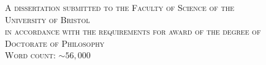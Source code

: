 
\newpage
\thispagestyle{empty}
\vspace*{\fill}%
\noindent
\textsc{
    \normalsize A dissertation submitted to the Faculty of Science of the \\ 
    \vspace{0.15cm}
    \LARGE University of Bristol \\    
    \vspace{0.3cm}
    \normalsize in accordance with the requirements for award of the degree of \\
    \vspace{0.15cm}
    \LARGE Doctorate of Philosophy \\

    \vspace{4cm}
    \small{Word count: $\sim56,000$}
}

\vfill